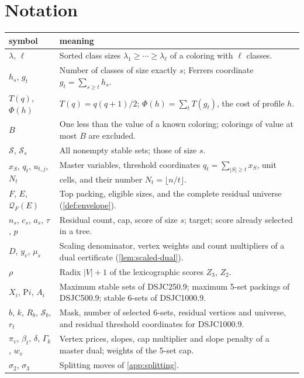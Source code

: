 \documentclass[11pt]{article}
\theoremstyle{definition}
\newcommand{\DSJCTwoFifty}{\textnormal{\textsc{DSJC250.9}}}
\newcommand{\DSJCFiveHundred}{\textnormal{\textsc{DSJC500.9}}}
\newcommand{\DSJCThousand}{\textnormal{\textsc{DSJC1000.9}}}
\newcommand{\Stable}{\mathcal{S}}
\newcommand{\Res}{\mathcal{Q}}
\begin{document}
\section{Notation}
\label{app:notation}

\begin{center}
\small
\begin{tabularx}{\textwidth}{@{}lY@{}}
\toprule
symbol & meaning\\
\midrule
$\lambda$, $\ell$ & Sorted class sizes $\lambda_1\ge\cdots\ge\lambda_\ell$ of a coloring with $\ell$ classes.\\
$h_s$, $g_t$ & Number of classes of size exactly $s$; Ferrers coordinate $g_t=\sum_{s\ge t}h_s$.\\
$T(q)$, $\Phi(h)$ & $T(q)=q(q+1)/2$; $\Phi(h)=\sum_tT(g_t)$, the cost of profile $h$.\\
$B$ & One less than the value of a known coloring; colorings of value at most $B$ are excluded.\\
$\Stable$, $\Stable_s$ & All nonempty stable sets; those of size $s$.\\
$x_S$, $q_t$, $u_{t,j}$, $N_t$ & Master variables, threshold coordinates $q_t=\sum_{|S|\ge t}x_S$, unit cells, and their number $N_t=\lfloor n/t\rfloor$.\\
$F$, $E$, $\Res_F(E)$ & Top packing, eligible sizes, and the complete residual universe (\cref{def:envelope}).\\
$n_s$, $c_s$, $a_s$, $\tau$, $p$ & Residual count, cap, score of size $s$; target; score already selected in a tree.\\
$D$, $y_v$, $\mu_s$ & Scaling denominator, vertex weights and count multipliers of a dual certificate (\cref{lem:scaled-dual}).\\
$\rho$ & Radix $|V|+1$ of the lexicographic scores $Z_3$, $Z_2$.\\
$X_i$, P$i$, $A_i$ & Maximum stable sets of \DSJCTwoFifty{}; maximum 5-set packings of \DSJCFiveHundred{}; stable 6-sets of \DSJCThousand{}.\\
$b$, $k$, $R_b$, $\Stable_b$, $r_t$ & Mask, number of selected 6-sets, residual vertices and universe, and residual threshold coordinates for \DSJCThousand{}.\\
$\pi_v$, $\beta_t$, $\delta$, $\Gamma_k$, $w_v$ & Vertex prices, slopes, cap multiplier and slope penalty of a master dual; weights of the 5-set cap.\\
$\sigma_2$, $\sigma_3$ & Splitting moves of \cref{app:splitting}.\\
\bottomrule
\end{tabularx}
\end{center}
\end{document}
